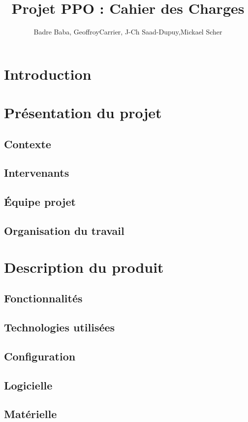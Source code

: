 \documentclass[10pt,a4paper]{article}
\title{Projet PPO : Cahier des Charges}
\author{
	Badre Baba, GeoffroyCarrier, J-Ch Saad-Dupuy,Mickael Scher
}
\begin{document}
\maketitle

\section{Introduction}
\section{Présentation du projet}
\subsection{Contexte}
\subsection{Intervenants}
\subsection{Équipe projet}
\subsection{Organisation du travail}

\section{Description du produit}
\subsection{Fonctionnalités}
\subsection{Technologies utilisées}
\subsection{Configuration}
\subsection{Logicielle}
\subsection{Matérielle}
\end{document}
